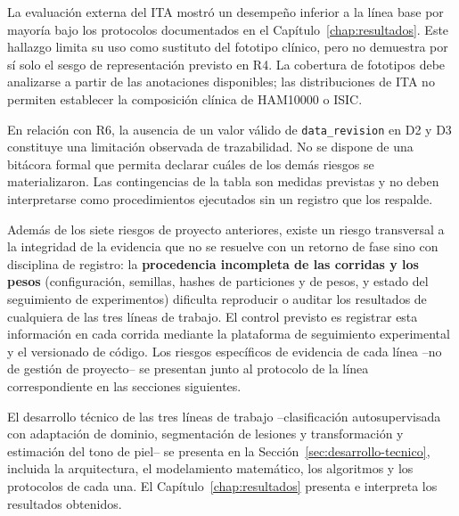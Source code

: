 La evaluación externa del ITA mostró un desempeño inferior a la línea base por mayoría bajo los protocolos documentados en el Capítulo~\ref{chap:resultados}. Este hallazgo limita su uso como sustituto del fototipo clínico, pero no demuestra por sí solo el sesgo de representación previsto en R4. La cobertura de fototipos debe analizarse a partir de las anotaciones disponibles; las distribuciones de ITA no permiten establecer la composición clínica de HAM10000 o ISIC.

En relación con R6, la ausencia de un valor válido de \texttt{data\_revision} en D2 y D3 constituye una limitación observada de trazabilidad. No se dispone de una bitácora formal que permita declarar cuáles de los demás riesgos se materializaron. Las contingencias de la tabla son medidas previstas y no deben interpretarse como procedimientos ejecutados sin un registro que los respalde.

Además de los siete riesgos de proyecto anteriores, existe un riesgo transversal a la integridad de la evidencia que no se resuelve con un retorno de fase sino con disciplina de registro: la \textbf{procedencia incompleta de las corridas y los pesos} (configuración, semillas, hashes de particiones y de pesos, y estado del seguimiento de experimentos) dificulta reproducir o auditar los resultados de cualquiera de las tres líneas de trabajo. El control previsto es registrar esta información en cada corrida mediante la plataforma de seguimiento experimental y el versionado de código. Los riesgos específicos de evidencia de cada línea --no de gestión de proyecto-- se presentan junto al protocolo de la línea correspondiente en las secciones siguientes.

El desarrollo técnico de las tres líneas de trabajo --clasificación autosupervisada con adaptación de dominio, segmentación de lesiones y transformación y estimación del tono de piel-- se presenta en la Sección~\ref{sec:desarrollo-tecnico}, incluida la arquitectura, el modelamiento matemático, los algoritmos y los protocolos de cada una. El Capítulo~\ref{chap:resultados} presenta e interpreta los resultados obtenidos.

